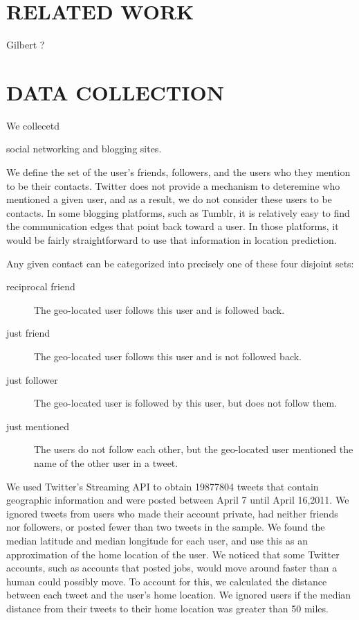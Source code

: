 \documentclass{sig-alternate}
\begin{document}
\section{RELATED WORK}
\cite{scellato2011socio}
\cite{scellato2010distance}
\cite{backstrom2010find}
\cite{cheng2010you}
Gilbert ?


\section{DATA COLLECTION}
We collecetd 

social networking and blogging sites.

We define the set of the user's friends, followers, and the users who they mention to be their contacts.
Twitter does not provide a mechanism to deteremine who mentioned a given user, and as a result, we do not consider these users to be contacts.
In some blogging platforms, such as Tumblr, it is relatively easy to find the communication edges that point back toward a user.
In those platforms, it would be fairly straightforward to use that information in location prediction.

Any given contact can be categorized into precisely one of these four disjoint sets:
\begin{description}
\item[reciprocal friend] The geo-located user follows this user and is followed back.
\item[just friend] The geo-located user follows this user and is not followed back.
\item[just follower]The geo-located user is followed by this user, but does not follow them.
\item[just mentioned] The users do not follow each other, but the geo-located user mentioned the name of the other user in a tweet.
\end{description}

We used Twitter's Streaming API to obtain 19877804 tweets that contain
geographic information and were posted between April 7 until April 16,2011.
We ignored tweets from users who made their account private, had neither
friends nor followers, or posted fewer than two tweets in the sample.
We found the median latitude and median longitude for each user, and use this
as an approximation of the home location of the user.
We noticed that some Twitter accounts, such as accounts that posted jobs, would
move around faster than a human could possibly move. To account for this, we
calculated the distance between each tweet and the user's home location. We
ignored users if the median distance from their tweets to their home location
was greater than 50 miles.
\end{document}
